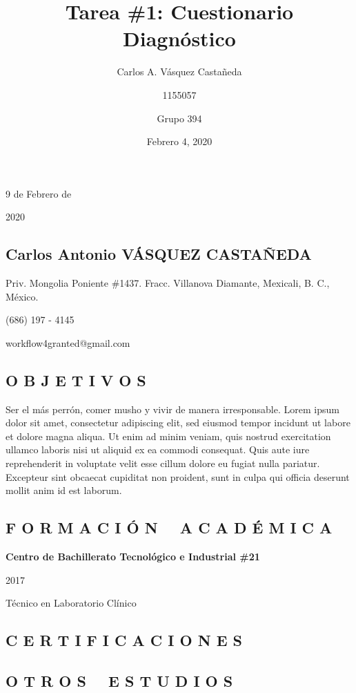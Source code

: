 \documentclass[12pt, letterpaper]{article}
\title{Tarea \#1: Cuestionario Diagnóstico}
\author{Carlos A. Vásquez Castañeda \and 1155057 \and Grupo 394}
\date{Febrero 4, 2020}
\begin{document}
{\selectfont

\begin{shaded}

\begin{flushleft}
	9 de Febrero de
\end{flushleft}
	\begin{flushleft}
		\vspace{-0.6cm}
		\hspace{0.8cm}
		2020
	\end{flushleft}
\begin{flushright}
	\vspace{-2.5cm}
\section*{Carlos Antonio VÁSQUEZ CASTAÑEDA}
\end{flushright}
\end{shaded}
Priv. Mongolia Poniente \#1437. Fracc. Villanova Diamante, Mexicali, B. C., México.

(686) 197 - 4145

workflow4granted@gmail.com

\subsection*{\textcolor{title}{O B J E T I V O S}}
Ser el más perrón, comer musho y vivir de manera irresponsable. Lorem ipsum dolor sit amet, consectetur adipiscing elit, sed eiusmod tempor incidunt ut labore et dolore magna aliqua. Ut enim ad minim veniam, quis nostrud exercitation ullamco laboris nisi ut aliquid ex ea commodi consequat. Quis aute iure reprehenderit in voluptate velit esse cillum dolore eu fugiat nulla pariatur. Excepteur sint obcaecat cupiditat non proident, sunt in culpa qui officia deserunt mollit anim id est laborum. 
\begin{shaded}
	\vspace{-0.3cm}
\subsection*{\textcolor{title}{F O R M A C I Ó N \ \ A C A D É M I C A}}

	\textbf{\textcolor{subtitle}{Centro de Bachillerato Tecnológico e Industrial \#21}}

	2017

	Técnico en Laboratorio Clínico
\end{shaded}


\subsection*{\textcolor{title}{C E R T I F I C A C I O N E S}}


\begin{shaded}
	\vspace{-0.3cm}
	\subsection*{\textcolor{title}{O T R O S \ \ E S T U D I O S}}

\end{shaded}
\renewcommand\refname{References}
\printbibliography
}
\end{document}
